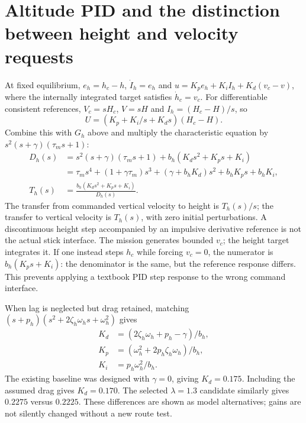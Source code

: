 \section{Altitude PID and the distinction between height and velocity requests}
At fixed equilibrium, $e_h=h_c-h$, $\dot I_h=e_h$ and
$u=K_pe_h+K_iI_h+K_d(v_c-v)$, where the internally integrated target satisfies
$\dot h_c=v_c$. For differentiable consistent references,
$V_c=sH_c$, $V=sH$ and $I_h=(H_c-H)/s$, so
\begin{equation}
U=(K_p+K_i/s+K_ds)(H_c-H).
\end{equation}
Combine this with $G_h$ above and multiply the characteristic equation by
$s^2(s+\gamma)(\tau_ms+1)$:
\begin{align}
D_h(s)&=s^2(s+\gamma)(\tau_ms+1)
+b_h(K_ds^2+K_ps+K_i)\\
&=\tau_ms^4+(1+\gamma\tau_m)s^3
+(\gamma+b_hK_d)s^2+b_hK_ps+b_hK_i,\\
\boxed{T_h(s)}&=\boxed{\frac{b_h(K_ds^2+K_ps+K_i)}{D_h(s)}}.
\end{align}
The transfer from commanded vertical velocity to height is $T_h(s)/s$;
the transfer to vertical velocity is $T_h(s)$, with zero initial perturbations.
A discontinuous height step accompanied by an impulsive derivative reference
is not the actual stick interface. The mission generates bounded $v_c$; the
height target integrates it. If one instead steps $h_c$ while forcing $v_c=0$,
the numerator is $b_h(K_ps+K_i)$: the denominator is the same, but the reference
response differs. This prevents applying a textbook PID step response to the
wrong command interface.

When lag is neglected but drag retained, matching
$(s+p_h)(s^2+2\zeta_h\omega_hs+\omega_h^2)$ gives
\begin{align}
K_d&=(2\zeta_h\omega_h+p_h-\gamma)/b_h,\\
K_p&=(\omega_h^2+2p_h\zeta_h\omega_h)/b_h,\\
K_i&=p_h\omega_h^2/b_h.
\end{align}
The existing baseline was designed with $\gamma=0$, giving $K_d=0.175$.
Including the assumed drag gives $K_d=0.170$. The selected $\lambda=1.3$
candidate similarly gives $0.2275$ versus $0.2225$. These differences are shown
as model alternatives; gains are not silently changed without a new route test.

